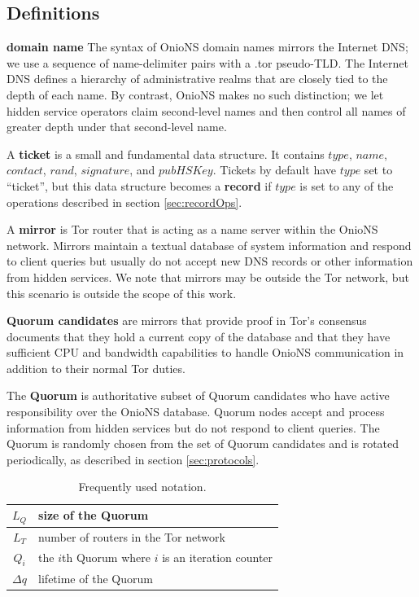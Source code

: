 \documentclass[USenglish,oneside,twocolumn]{article}
\begin{document}
\subsection{Definitions}

\textbf{domain name} The syntax of OnioNS domain names mirrors the Internet DNS; we use a sequence of name-delimiter pairs with a .tor pseudo-TLD. The Internet DNS defines a hierarchy of administrative realms that are closely tied to the depth of each name. By contrast, OnioNS makes no such distinction; we let hidden service operators claim second-level names and then control all names of greater depth under that second-level name.

A \textbf{ticket} is a small and fundamental data structure. It contains $ \mathit{type} $, $ \mathit{name} $, $ \mathit{contact} $, $ \mathit{rand} $, $ \mathit{signature} $, and $ \mathit{pubHSKey} $. Tickets by default have $ \mathit{type} $ set to ``ticket'', but this data structure becomes a \textbf{record} if $ \mathit{type} $ is set to any of the operations described in section \ref{sec:recordOps}.

A \textbf{mirror} is Tor router that is acting as a name server within the OnioNS network. Mirrors maintain a textual database of system information and respond to client queries but usually do not accept new DNS records or other information from hidden services. We note that mirrors may be outside the Tor network, but this scenario is outside the scope of this work.

\textbf{Quorum candidates} are mirrors that provide proof in Tor's consensus documents that they hold a current copy of the database and that they have sufficient CPU and bandwidth capabilities to handle OnioNS communication in addition to their normal Tor duties.

The \textbf{Quorum} is authoritative subset of Quorum candidates who have active responsibility over the OnioNS database. Quorum nodes accept and process information from hidden services but do not respond to client queries. The Quorum is randomly chosen from the set of Quorum candidates and is rotated periodically, as described in section \ref{sec:protocols}.

\begin{center}
	\vspace{0mm}
	\begin{table}[htp]
		\hspace{5 mm}
  		\begin{tabular}{ | c | l | }
			$ L_{Q} $ & size of the Quorum \\ \hline
			$ L_{T} $ & number of routers in the Tor network \\ \hline
			$ Q_{i} $ & the $ i $th Quorum where $ i $ is an iteration counter \\ \hline
			$ \Delta q $ & lifetime of the Quorum \\
		\end{tabular}
		\caption{Frequently used notation.}
	\end{table}
	\vspace{-10mm}
\end{center}
\end{document}
